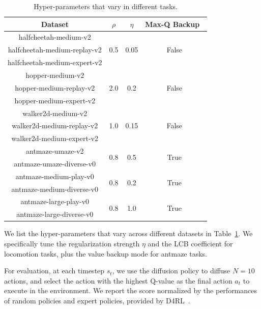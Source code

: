 \begin{table}[htbp]
    \centering
    \caption{Hyper-parameters that vary in different tasks.}
    \label{apptab:different_param}
    \begin{tabular}{c||c|c|c}
        \toprule
        Dataset & $\rho$ & $\eta$ & Max-Q Backup~\citep{dql}\\
        \midrule
        halfcheetah-medium-v2 & \multirow{3}{*}{0.5} & \multirow{3}{*}{0.05} & \multirow{3}{*}{False}\\
        halfcheetah-medium-replay-v2 &&&\\
        halfcheetah-medium-expert-v2 &&&\\
        \midrule
        hopper-medium-v2 & \multirow{3}{*}{2.0} & \multirow{3}{*}{0.2} &\multirow{3}{*}{False}\\
        hopper-medium-replay-v2 &&&\\
        hopper-medium-expert-v2 &&&\\
        \midrule
        walker2d-medium-v2 & \multirow{3}{*}{1.0} & \multirow{3}{*}{0.15} &\multirow{3}{*}{False}\\
        walker2d-medium-replay-v2 &&&\\
        walker2d-medium-expert-v2 &&&\\
        \midrule
        antmaze-umaze-v2 & \multirow{2}{*}{0.8} & \multirow{2}{*}{0.5} & \multirow{2}{*}{True} \\
        antmaze-umaze-diverse-v0 &&  & \\
        \midrule
        antmaze-medium-play-v0 & \multirow{2}{*}{0.8}& \multirow{2}{*}{0.2} & \multirow{2}{*}{True}\\
        antmaze-medium-diverse-v0 & &  & \\
        \midrule
        antmaze-large-play-v0 & \multirow{2}{*}{0.8}& \multirow{2}{*}{1.0} & \multirow{2}{*}{True} \\
        antmaze-large-diverse-v0 & &  &  \\
        \bottomrule
    \end{tabular}
\end{table}

We list the hyper-parameters that vary across different datasets in Table~\ref{apptab:different_param}. We specifically tune the regularization strength $\eta$ and the LCB coefficient for locomotion tasks, plus the value backup mode for antmaze tasks. 

For evaluation, at each timestep $s_t$, we use the diffusion policy to diffuse $N=10$ actions, and select the action with the highest Q-value as the final action $a_t$ to execute in the environment. We report the score normalized by the performances of random policies and expert policies, provided by D4RL~\citep{d4rl}. 

